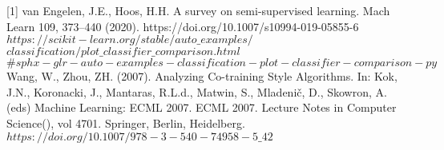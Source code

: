 [1] van Engelen, J.E., Hoos, H.H. A survey on semi-supervised learning. Mach Learn 109, 373–440 (2020). https://doi.org/10.1007/s10994-019-05855-6\newline
[2] $https://scikit-learn.org/stable/auto\_examples/$\newline$classification/plot\_classifier\_comparison.html$\newline$\#sphx-glr-auto-examples-classification-plot-classifier-comparison-py$\newline
[3] Wang, W., Zhou, ZH. (2007). Analyzing Co-training Style Algorithms. In: Kok, J.N., Koronacki, J., Mantaras, R.L.d., Matwin, S., Mladenič, D., Skowron, A. (eds) Machine Learning: ECML 2007. ECML 2007. Lecture Notes in Computer Science(), vol 4701. Springer, Berlin, Heidelberg. $https://doi.org/10.1007/978-3-540-74958-5\_42$
 